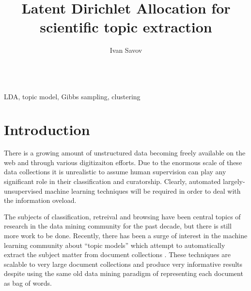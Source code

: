 \documentclass[11pt]{article}
\author{Ivan Savov}
\title{ {\LARGE Latent Dirichlet Allocation for \\ scientific topic extraction } }
\begin{document}
\maketitle


\ \\
 LDA, topic model, Gibbs sampling, clustering 


\section{Introduction}

    There is a growing amount of unstructured data becoming freely available on the web and
    through various digitizaiton efforts.
    Due to the enormous scale of these data collections it is unrealistic to assume human
    supervision can play any significant role in their classification and curatorship.
    Clearly, automated largely-unsupervised machine learning techniques will be required
    in order to deal with the information oveload.

    The subjects of classification, retreival and browsing have been central topics of research
    in the data mining community for the past decade, but there is still more work to be done.
    Recently, there has been a surge of interest in the machine learning community about
    ``topic models'' which attempt to automatically extract the subject matter from
    document collections \cite{Blei2003,Blei2009}.
    These techniques are scalable to very large document collections and produce very informative
    results despite using the same old data mining paradigm of representing each document as bag of words.
\end{document}

